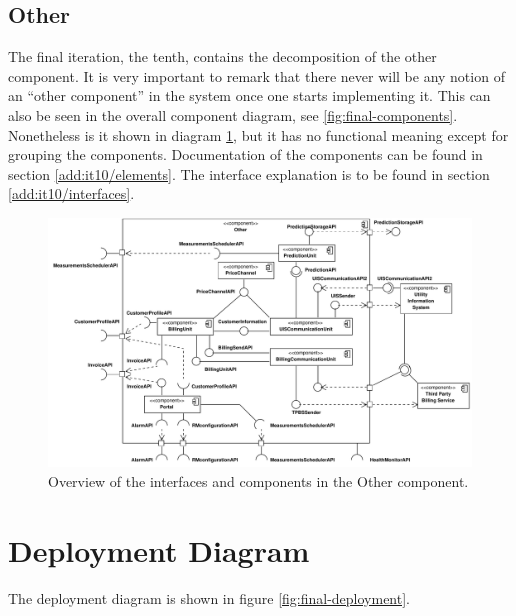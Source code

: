 \subsection{Other}

\npar The final iteration, the tenth, contains the decomposition of the other
component. It is very important to remark that there never will be any notion of
an ``other component'' in the system once one starts implementing it. This can
also be seen in the overall component diagram, see \ref{fig:final-components}.
Nonetheless is it shown in diagram \ref{fig:final-architecture/it10}, but it has
no functional meaning except for grouping the components. Documentation of the
components can be found in section \ref{add:it10/elements}. The interface
explanation is to be found in section \ref{add:it10/interfaces}.

\begin{figure}
	\begin{centering}
		\includegraphics[width=1.4\textwidth,angle=90]{figs/add-it10-interfaces.pdf}
		\caption{Overview of the interfaces and components in the Other component.}
		\label{fig:final-architecture/it10}
	\end{centering}
\end{figure}

\section{Deployment Diagram}

\npar The deployment diagram is shown in figure \ref{fig:final-deployment}. 

